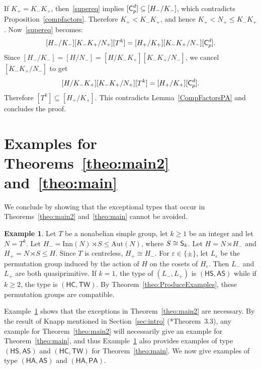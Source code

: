 \documentclass[twoside,12pt,leqno]{amsproc}
\numberwithin{table}{section}
\numberwithin{figure}{section}
\theoremstyle{plain}
\theoremstyle{definition}\newtheorem{definition}[theorem]{Definition}
\theoremstyle{definition}\newtheorem{example}[theorem]{Example}
\theoremstyle{definition}\newtheorem{construction}[theorem]{Construction}
\theoremstyle{definition}\newtheorem{remark}[theorem]{Remark}
\theoremstyle{definition}\newtheorem{problem}[theorem]{Problem}
\begin{document}
If $K_+=K_-K_+$, then~\eqref{supereq} implies $[{\textup{\textsf{C}}}_p^d]\subseteq [H_-/K_-]$, which contradicts Proposition~\ref{compfactors}. Therefore  $K_+<K_-K_+$, and hence $K_+<N_+{\leqslant} K_-K_+$. Now~\eqref{supereq} becomes:
$$
  [H_-/K_-][K_-K_+/N_+][T^k] =[H_+/K_+][K_-K_+/N_-][{\textup{\textsf{C}}}_p^d].
$$
Since $[H_-/K_-]=[H/N_-]=[H/K_-K_+][K_-K_+/N_-]$, we cancel $[K_-K_+/N_-]$ to get
$$
  [H/K_-K_+][K_-K_+/N_+][T^k] =[H_+/K_+][{\textup{\textsf{C}}}_p^d].
$$
Therefore $[T^k]\subseteq [H_+/K_+]$. This contradicts Lemma~\ref{CompFactorsPA} and concludes the proof.

\section{Examples for Theorems~\ref{theo:main2} and~\ref{theo:main}}\label{sec:examples}

We conclude by showing that the exceptional types that occur in Theorems~\ref{theo:main2} and~\ref{theo:main} cannot be avoided.

\begin{example}\label{ExampleHCTW}
Let $T$ be a nonabelian simple group, let $k{\geqslant} 1$ be an integer and let $N=T^k$. Let $H_-={\mathrm{Inn}}(N)\rtimes S\leqslant{\mathrm{Aut}}(N)$, where $S\cong {\textup{\textsf{S}}}_k$. Let $H=N\rtimes H_-$ and $H_+=N\rtimes S\leqslant H$. Since $T$ is centreless, $H_+\cong H_-$. For ${\varepsilon}\in\{\pm\}$, let $L_{\varepsilon}$ be the permutation group induced by the action of $H$ on the cosets of $H_{\varepsilon}$. Then $L_-$ and $L_+$ are both quasiprimitive. If $k=1$, the type of $(L_-,L_+)$ is $({\mathsf{HS}},{\mathsf{AS}})$ while if $k{\geqslant} 2$, the type is $({\mathsf{HC}},{\mathsf{TW}})$. By Theorem~\ref{theo:ProduceExamples}, these permutation groups are compatible.
\end{example}

Example~\ref{ExampleHCTW} shows that the exceptions in Theorem~\ref{theo:main2} are necessary. By the result of Knapp mentioned in Section~\ref{sec:intro} (\cite{Knapp}*{Theorem~3.3}), any example for Theorem~\ref{theo:main2} will necessarily give an example for Theorem~\ref{theo:main}, and thus Example~\ref{ExampleHCTW} also provides examples of type $({\mathsf{HS}},{\mathsf{AS}})$ and $({\mathsf{HC}},{\mathsf{TW}})$ for Theorem~\ref{theo:main}. We now give examples of type $({\mathsf{HA}},{\mathsf{AS}})$ and $({\mathsf{HA}},{\mathsf{PA}})$.
\end{document}
